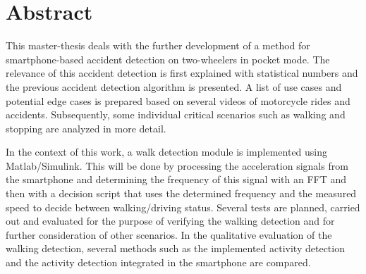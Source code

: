 \begingroup %
\let\cleardoublepage\relax
\chapter*{Abstract}
This master-thesis deals with the further development of a method for smartphone-based accident detection on two-wheelers in pocket mode.
The relevance of this accident detection is first explained with statistical numbers and the previous accident detection algorithm is presented.
A list of use cases and potential edge cases is prepared based on several videos of motorcycle rides and accidents. Subsequently, some individual critical scenarios such as walking and stopping are analyzed in more detail.

In the context of this work, a walk detection module is implemented using Matlab/Simulink. This will be done by processing the acceleration signals from the smartphone and determining the frequency of this signal with an FFT and then with a decision script that uses the determined frequency and the measured speed to decide between walking/driving status.
Several tests are planned, carried out and evaluated for the purpose of verifying the walking detection and for further consideration of other scenarios.
In the qualitative evaluation of the walking detection, several methods such as the implemented activity detection and the activity detection integrated in the smartphone are compared.



\endgroup
\cleardoublepage